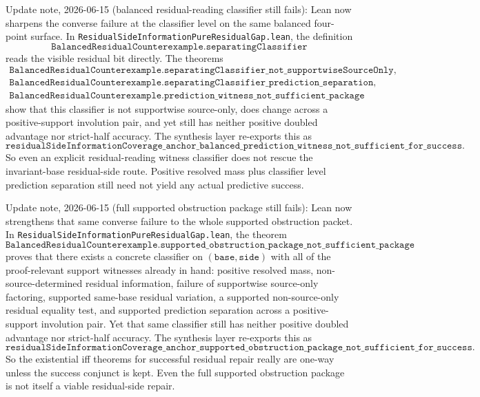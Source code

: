 \documentclass[11pt]{article}
\theoremstyle{remark}
\begin{document}
Update note, 2026-06-15 (balanced residual-reading classifier still fails):
Lean now sharpens the converse failure at the classifier level on the same
balanced four-point surface.  In
\texttt{ResidualSideInformationPureResidualGap.lean}, the definition
\[
\texttt{BalancedResidualCounterexample.separatingClassifier}
\]
reads the visible residual bit directly.  The theorems
\[
\begin{gathered}
\texttt{BalancedResidualCounterexample.separatingClassifier\_not\_supportwiseSourceOnly},\\
\texttt{BalancedResidualCounterexample.separatingClassifier\_prediction\_separation},\\
\texttt{BalancedResidualCounterexample.prediction\_witness\_not\_sufficient\_package}
\end{gathered}
\]
show that this classifier is not supportwise source-only, does change across a
positive-support involution pair, and yet still has neither positive doubled
advantage nor strict-half accuracy.  The synthesis layer re-exports this as
\[
\texttt{residualSideInformationCoverage\_anchor\_balanced\_prediction\_witness\_not\_sufficient\_for\_success}.
\]
So even an explicit residual-reading witness classifier does not rescue the
invariant-base residual-side route.  Positive resolved mass plus classifier
level prediction separation still need not yield any actual predictive
success.

Update note, 2026-06-15 (full supported obstruction package still fails): Lean
now strengthens that same converse failure to the whole supported obstruction
packet.  In \texttt{ResidualSideInformationPureResidualGap.lean}, the theorem
\[
\texttt{BalancedResidualCounterexample.supported\_obstruction\_package\_not\_sufficient\_package}
\]
proves that there exists a concrete classifier on \((\texttt{base},\texttt{side})\)
with all of the proof-relevant support witnesses already in hand: positive
resolved mass, non-source-determined residual information, failure of
supportwise source-only factoring, supported same-base residual variation, a
supported non-source-only residual equality test, and supported prediction
separation across a positive-support involution pair.  Yet that same classifier
still has neither positive doubled advantage nor strict-half accuracy.  The
synthesis layer re-exports this as
\[
\texttt{residualSideInformationCoverage\_anchor\_supported\_obstruction\_package\_not\_sufficient\_for\_success}.
\]
So the existential iff theorems for successful residual repair really are
one-way unless the success conjunct is kept.  Even the full supported
obstruction package is not itself a viable residual-side repair.
\end{document}
